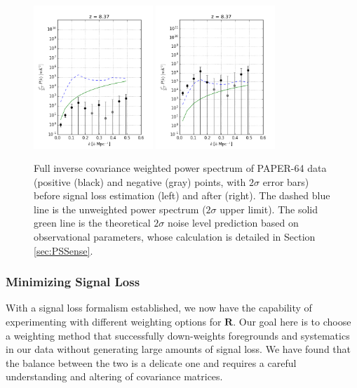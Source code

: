 \documentclass[preprint2,numberedappendix,tighten]{aastex6}  %
\begin{document}
\begin{figure}
	\centering
	\includegraphics[width=0.4\textwidth]{plots/ps2_data_nosigloss.png}
	\includegraphics[width=0.4\textwidth]{plots/ps2_data.png}
	\caption{Full inverse covariance weighted power spectrum of PAPER-64 data (positive (black) and negative (gray) points, 
with $2\sigma$ error bars) before signal loss estimation (left) and after (right). The dashed blue line is the unweighted power 
spectrum ($2\sigma$ upper limit). The solid green line is the theoretical $2\sigma$ noise level prediction based on observational 
parameters, whose calculation is detailed in Section \ref{sec:PSSense}.}
	\label{fig:ps2_data}
\end{figure}


\subsubsection{Minimizing Signal Loss}
\label{sec:Weight}

With a signal loss formalism established, we now have the capability of experimenting 
with different weighting options for $\textbf{R}$. Our goal here is to choose a weighting method that successfully down-weights 
foregrounds and systematics in our data without generating large amounts of signal loss. We have found that the balance 
between the two is a delicate one and requires a careful understanding and altering of covariance matrices. 
\end{document}
